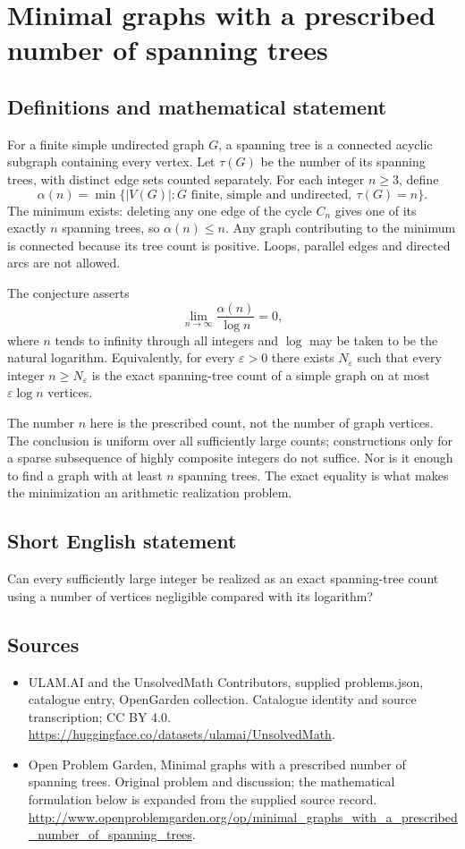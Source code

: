 \documentclass[11pt,a4paper]{article}
\begin{document}
\section*{Minimal graphs with a prescribed number of spanning trees}\label{statement}

\subsection{Definitions and mathematical statement}
For a finite simple undirected graph $G$, a spanning tree is a connected
acyclic subgraph containing every vertex. Let $\tau(G)$ be the number
of its spanning trees, with distinct edge sets counted separately.
For each integer $n\ge3$, define
\[
 \alpha(n)=\min\{|V(G)|:G\text{ finite, simple and undirected},\
                                  \tau(G)=n\}.
\]
The minimum exists: deleting any one edge of the cycle $C_n$ gives
one of its exactly $n$ spanning trees, so $\alpha(n)\le n$.
Any graph contributing to the minimum is connected because its tree
count is positive. Loops, parallel edges and directed arcs are not allowed.

The conjecture asserts
\[
 \lim_{n\to\infty}\frac{\alpha(n)}{\log n}=0,
\]
where $n$ tends to infinity through all integers and $\log$ may be taken
to be the natural logarithm. Equivalently, for every $\varepsilon>0$
there exists $N_\varepsilon$ such that every integer $n\ge N_\varepsilon$
is the exact spanning-tree count of a simple graph on at most
$\varepsilon\log n$ vertices.

The number $n$ here is the prescribed count, not the number of graph
vertices. The conclusion is uniform over all sufficiently large counts;
constructions only for a sparse subsequence of highly composite integers
do not suffice. Nor is it enough to find a graph with at least $n$
spanning trees. The exact equality is what makes the minimization an
arithmetic realization problem.
\subsection{Short English statement}
Can every sufficiently large integer be realized as an exact spanning-tree count using a number of vertices negligible compared with its logarithm?
\subsection{Sources}
\begin{itemize}
\item[S1] ULAM.AI and the UnsolvedMath Contributors, supplied problems.json, catalogue entry, OpenGarden collection. Catalogue identity and source transcription; CC BY 4.0.
\url{https://huggingface.co/datasets/ulamai/UnsolvedMath}.
\item[S2] Open Problem Garden, Minimal graphs with a prescribed number of spanning trees. Original problem and discussion; the mathematical formulation below is expanded from the supplied source record.
\url{http://www.openproblemgarden.org/op/minimal_graphs_with_a_prescribed_number_of_spanning_trees}.
\end{itemize}
\end{document}
